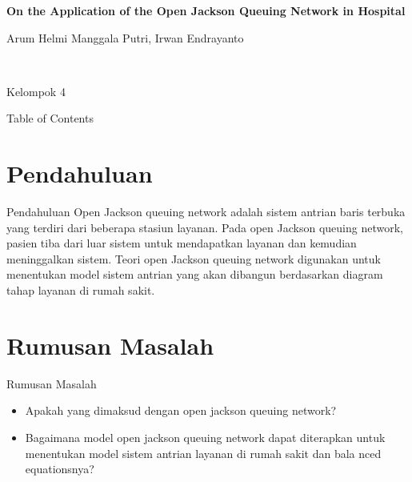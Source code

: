 \documentclass[aspectratio=169]{beamer}
\begin{document}


\begin{frame}
    \begin{center}
    \color{mygreen} \huge \textbf{On the Application of the Open Jackson Queuing Network in Hospital}
    \end{center}
    \begin{center}
        Arum Helmi Manggala Putri, Irwan Endrayanto
    \end{center}
    \\
    \begin{center}
        \color{mygreen!90} \large Kelompok 4
    \end{center}
\end{frame}

\begin{frame}{Table of Contents}
	\tableofcontents
\end{frame}

\section{\color{mygreen}\huge Pendahuluan}
\begin{frame}{Pendahuluan}
Open Jackson queuing network adalah sistem antrian baris terbuka yang terdiri dari beberapa stasiun layanan. Pada open Jackson queuing network, pasien tiba dari luar sistem untuk mendapatkan layanan dan kemudian meninggalkan sistem. Teori open Jackson queuing network digunakan untuk menentukan model sistem antrian yang akan dibangun berdasarkan diagram tahap layanan di rumah sakit.
\end{frame}
    

\section{\color{mygreen}\huge Rumusan Masalah}
\begin{frame}{Rumusan Masalah}
\begin{itemize}
    \item Apakah yang dimaksud dengan open jackson queuing network?
    \item Bagaimana model open jackson queuing network dapat diterapkan untuk menentukan model sistem antrian layanan di rumah sakit dan bala nced equationsnya?






\end{itemize}
\end{frame}
\end{document}
